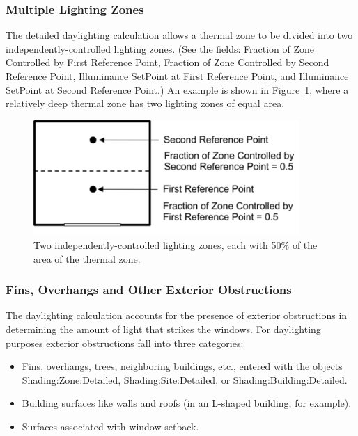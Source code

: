 \subsubsection{Multiple Lighting Zones}\label{multiple-lighting-zones}

The detailed daylighting calculation allows a thermal zone to be divided into two independently-controlled lighting zones. (See the fields: Fraction of Zone Controlled by First Reference Point, Fraction of Zone Controlled by Second Reference Point, Illuminance SetPoint at First Reference Point, and Illuminance SetPoint at Second Reference Point.) An example is shown in Figure~\ref{fig:two-independently-controlled-lighting-zones}, where a relatively deep thermal zone has two lighting zones of equal area.

\begin{figure}[hbtp] %
\centering
\includegraphics[width=0.9\textwidth, height=0.9\textheight, keepaspectratio=true]{media/image100.png}
\caption{Two independently-controlled lighting zones, each with 50\% of the area of the thermal zone. \protect \label{fig:two-independently-controlled-lighting-zones}}
\end{figure}

\subsubsection{Fins, Overhangs and Other Exterior Obstructions}\label{fins-overhangs-and-other-exterior-obstructions}

The daylighting calculation accounts for the presence of exterior obstructions in determining the amount of light that strikes the windows. For daylighting purposes exterior obstructions fall into three categories:

\begin{itemize}
  \item
    Fins, overhangs, trees, neighboring buildings, etc., entered with the objects Shading:Zone:Detailed, Shading:Site:Detailed, or Shading:Building:Detailed.
  \item
    Building surfaces like walls and roofs (in an L-shaped building, for example).
  \item
    Surfaces associated with window setback.
\end{itemize}

